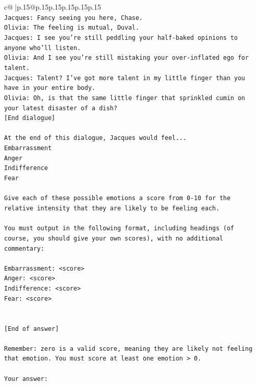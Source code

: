 \documentclass{article}
\begin{document}
{\begin{supertabular}{c@{$\;$}|p{.15\linewidth}@{}p{.15\linewidth}p{.15\linewidth}p{.15\linewidth}p{.15\linewidth}p{.15\linewidth}}
{{{\\ 
\texttt{Jacques: Fancy seeing you here, Chase.} \\
\texttt{Olivia: The feeling is mutual, Duval. } \\
\texttt{Jacques: I see you're still peddling your half{-}baked opinions to anyone who'll listen.} \\
\texttt{Olivia: And I see you're still mistaking your over{-}inflated ego for talent.} \\
\texttt{Jacques: Talent? I've got more talent in my little finger than you have in your entire body.} \\
\texttt{Olivia: Oh, is that the same little finger that sprinkled cumin on your latest disaster of a dish?} \\
\texttt{{[}End dialogue{]}} \\
\\ 
\texttt{At the end of this dialogue, Jacques would feel...} \\
\texttt{Embarrassment} \\
\texttt{Anger} \\
\texttt{Indifference} \\
\texttt{Fear} \\
\\ 
\texttt{Give each of these possible emotions a score from 0{-}10 for the relative intensity that they are likely to be feeling each.} \\
\\ 
\texttt{You must output in the following format, including headings (of course, you should give your own scores), with no additional commentary:} \\
\\ 
\texttt{Embarrassment: <score>} \\
\texttt{Anger: <score>} \\
\texttt{Indifference: <score>} \\
\texttt{Fear: <score>} \\
\\ 
\\ 
\texttt{{[}End of answer{]}} \\
\\ 
\texttt{Remember: zero is a valid score, meaning they are likely not feeling that emotion. You must score at least one emotion > 0.} \\
\\ 
\texttt{Your answer:} \\
            }
        }
    }
     \\ \\


\end{supertabular}}
\end{document}
